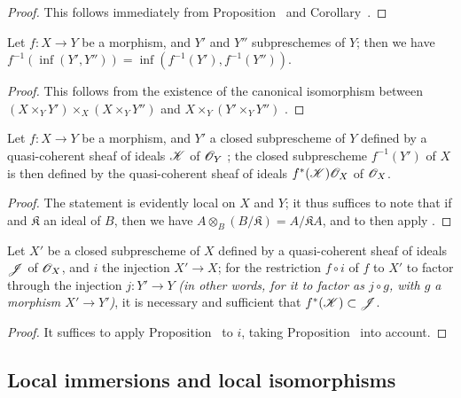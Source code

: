 \begin{proof}
This follows immediately from Proposition~ and Corollary~.
\end{proof}

\begin{corollary}[4.4.4]
\label{I.4.4.4}
Let $f:X\to Y$ be a morphism, and $Y'$ and $Y''$ subpreschemes of $Y$;
then we have $f^{-1}(\inf(Y',Y''))=\inf(f^{-1}(Y'),f^{-1}(Y''))$.
\end{corollary}

\begin{proof}
This follows from the existence of the canonical isomorphism between $(X\times_Y Y')\times_X(X\times_Y Y'')$ and $X\times_Y(Y'\times_Y Y'')$ .
\end{proof}

\begin{proposition}[4.4.5]
\label{I.4.4.5}
Let $f:X\to Y$ be a morphism, and $Y'$ a closed subprescheme of $Y$ defined by a quasi-coherent sheaf of ideals $\mathscr{K}$ of $\mathscr{O}_Y$ ;
the closed subprescheme $f^{-1}(Y')$ of $X$ is then defined by the quasi-coherent sheaf of ideals $f^*(\mathscr{K})\mathscr{O}_X$ of $\mathscr{O}_X$.
\end{proposition}

\begin{proof}
The statement is evidently local on $X$ and $Y$;
it thus suffices to note that if  and $\mathfrak{K}$ an ideal of $B$, then we have $A\otimes_B(B/\mathfrak{K})=A/\mathfrak{K}A$, and to then apply .
\end{proof}

\begin{corollary}[4.4.6]
\label{I.4.4.6}
Let $X'$ be a closed subprescheme of $X$ defined by a quasi-coherent sheaf of ideals $\mathscr{J}$ of $\mathscr{O}_X$, and $i$ the injection $X'\to X$;
for the restriction $f\circ i$ of $f$ to $X'$ to factor through the injection $j:Y'\to Y$ \emph{(in other words, for it to factor as $j\circ g$, with $g$ a morphism $X'\to Y'$)}, it is necessary and sufficient that $f^*(\mathscr{K})\subset\mathscr{J}$.
\end{corollary}

\begin{proof}
It suffices to apply Proposition~ to $i$, taking Proposition~ into account.
\end{proof}

\subsection{Local immersions and local isomorphisms}
\label{subsection:I.4.5}

